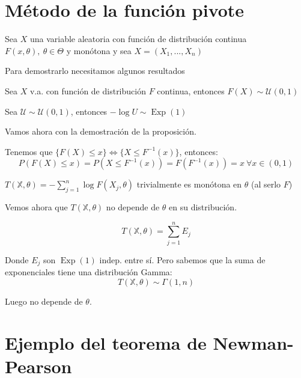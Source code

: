 \documentclass[openany]{book}
\begin{document}
\section{Método de la función pivote}

\setcounter{dummy}{0}

\begin{proposition}
    Sea $ X $ una variable aleatoria con función de distribución continua $ F(x,\theta),\ \theta \in \Theta  $ y monótona y sea $ X = (X_1,...,X_n) $
\end{proposition}

Para demostrarlo necesitamos algunos resultados

\begin{lemma}
    
    Sea $ X $ v.a. con función de distribución $ F $ continua, entonces $ F(X) \sim \mathcal{U}(0,1)$ 
\end{lemma}

\begin{lemma}
    Sea $ \mathcal{U} \sim \mathcal{U}(0,1) $, entonces $ -\log{U} \sim \operatorname{Exp}(1) $
\end{lemma}

Vamos ahora con la demostración de la proposición.

\begin{demonstration}
    Tenemos que $ \{F(X) \leq  x\} \iff \{X \leq  F ^{-1}(x)\} $, entonces:
    $$ P(F(X)\leq x) = P(X \leq  F ^{-1}(x)) = F(F ^{-1}(x)) = x\  \forall x \in (0,1)$$
\end{demonstration}

\begin{demonstration}
    $ T(\mathbb{X},\theta) = - \sum\limits_{j=1}^{n} \log{F(X_j,\theta)} $ trivialmente es monótona en $ \theta $ (al serlo $ F $)

    Vemos ahora que $ T(\mathbb{X}, \theta) $ no depende de $ \theta $ en su distribución.

    $$ T(\mathbb{X},\theta) = \sum\limits_{j=1}^{n} E_j $$

    Donde $ E_j $ son $ \operatorname{Exp}(1) $ indep. entre sí. Pero sabemos que la suma de exponenciales tiene una distribución Gamma:
    $$ T(\mathbb{X},\theta) \sim \Gamma(1,n) $$

    Luego no depende de $ \theta $.

\end{demonstration}


\section*{Ejemplo del teorema de Newman-Pearson}
\end{document}
